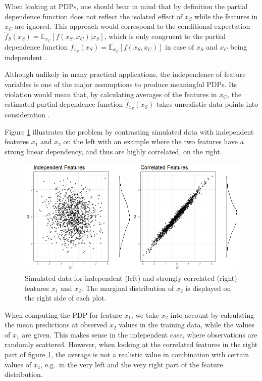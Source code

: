 \documentclass[]{krantz}
\begin{document}
When looking at PDPs, one should bear in mind that by definition the
partial dependence function does not reflect the isolated effect of
\(x_S\) while the features in \(x_C\) are ignored. This approach would
correspond to the conditional expectation
\(\tilde{f}_S(x_S) = \mathbb{E}_{x_C}[f(x_S, x_C)|x_S]\), which is only
congruent to the partial dependence function
\(f_{x_S}(x_S) = \mathbb{E}_{x_C}[f(x_S, x_C)]\) in case of \(x_S\) and
\(x_C\) being independent \citep{hastie2013elements}.

Although unlikely in many practical applications, the independence of
feature variables is one of the major assumptions to produce meaningful
PDPs. Its violation would mean that, by calculating averages of the
features in \(x_C\), the estimated partial dependence function
\(\hat{f}_{x_S}(x_S)\) takes unrealistic data points into consideration
\citep{molnar2019}.

Figure \ref{fig:Figure01} illustrates the problem by contrasting
simulated data with independent features \(x_1\) and \(x_2\) on the left
with an example where the two features have a strong linear dependency,
and thus are highly correlated, on the right.

\begin{figure}
\includegraphics[width=1\linewidth]{images/VK_PDP_1_Data_ind_dep} \caption{Simulated data for independent (left) and strongly correlated (right) features $x_1$ and $x_2$. The marginal distribution of $x_2$ is displayed on the right side of each plot.}\label{fig:Figure01}
\end{figure}

When computing the PDP for feature \(x_1\), we take \(x_2\) into account
by calculating the mean predictions at observed \(x_2\) values in the
training data, while the values of \(x_1\) are given. This makes sense
in the independent case, where observations are randomly scattered.
However, when looking at the correlated features in the right part of
figure \ref{fig:Figure01}, the average is not a realistic value in
combination with certain values of \(x_1\), e.g.~in the very left and
the very right part of the feature distribution.
\end{document}
